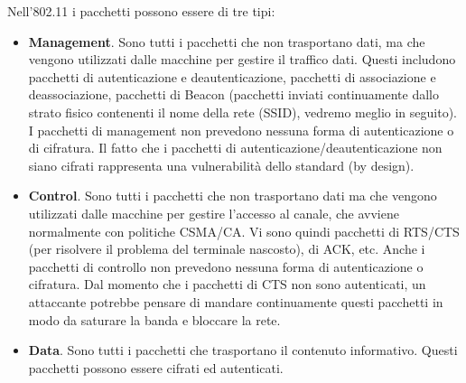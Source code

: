 Nell'802.11 i pacchetti possono essere di tre tipi:
\begin{itemize}
	\item \textbf{Management}. Sono tutti i pacchetti che non trasportano dati, ma che vengono utilizzati dalle macchine per gestire il traffico dati. Questi includono pacchetti di autenticazione e deautenticazione, pacchetti di associazione e deassociazione, pacchetti di Beacon (pacchetti inviati continuamente dallo strato fisico contenenti il nome della rete (SSID), vedremo meglio in seguito). I pacchetti di management non prevedono nessuna forma di autenticazione o di cifratura. Il fatto che i pacchetti di autenticazione/deautenticazione non siano cifrati rappresenta una vulnerabilità dello standard (by design).
	\item \textbf{Control}. Sono tutti i pacchetti che non trasportano dati ma che vengono utilizzati dalle macchine per gestire l'accesso al canale, che avviene normalmente con politiche CSMA/CA. Vi sono quindi pacchetti di RTS/CTS (per risolvere il problema del terminale nascosto), di ACK, etc. Anche i pacchetti di controllo non prevedono nessuna forma di autenticazione o cifratura. Dal momento che i pacchetti di CTS non sono autenticati, un attaccante potrebbe pensare di mandare continuamente questi pacchetti in modo da saturare la banda e bloccare la rete.
	\item \textbf{Data}. Sono tutti i pacchetti che trasportano il contenuto informativo. Questi pacchetti possono essere cifrati ed autenticati.
\end{itemize}

